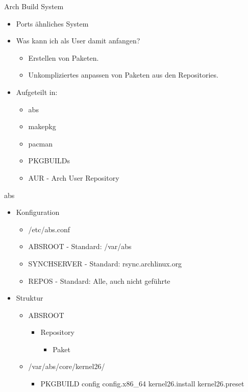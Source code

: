 
\begin{slide}{Arch Build System}
	\begin{itemize}
		\item{Ports \"{a}hnliches System}
		\item{Was kann ich als User damit anfangen?
			\begin{itemize}
				\item{Erstellen von Paketen.}
				\item{Unkompliziertes anpassen von Paketen aus den 
					Repositories.}
			\end{itemize}
		}
		\item{Aufgeteilt in:
			\begin{itemize}
				\item{abs}
				\item{makepkg}
				\item{pacman}
				\item{PKGBUILDs}
				\item{AUR - Arch User Repository}
			\end{itemize}
		}
	\end{itemize}
\end{slide}

\begin{slide}{abs}
	\begin{itemize}
		\item{Konfiguration
			\begin{itemize}
				\item{/etc/abs.conf}
				\item{ABSROOT -  Standard: /var/abs}
				\item{SYNCHSERVER - Standard: rsync.archlinux.org}
				\item{REPOS - Standard: Alle, auch nicht gef\"{u}hrte}
			\end{itemize}
		}
		\item{Struktur
			\begin{itemize}
				\item{ABSROOT
					\begin{itemize}
						\item{Repository
							\begin{itemize}
								\item{Paket}
							\end{itemize}
						}
					\end{itemize}
				}
				\item{/var/abs/core/kernel26/
					\begin{itemize}
						\item{PKGBUILD config config.x86\_64 kernel26.install
							kernel26.preset}
					\end{itemize}
				}
			\end{itemize}
		}
	\end{itemize}
\end{slide}

